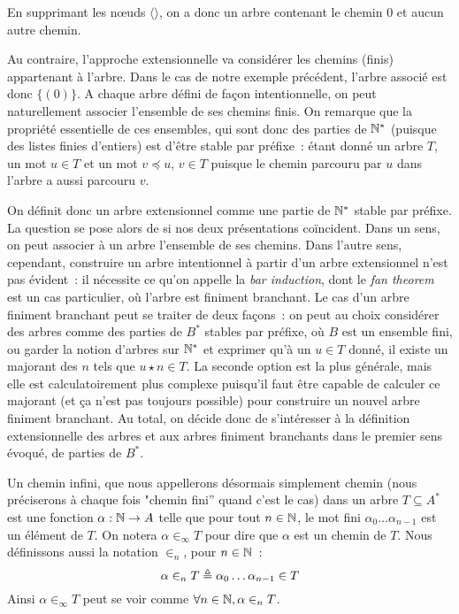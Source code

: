 \documentclass{article}
\begin{document}
En supprimant les n\oe uds $\langle\rangle$, on a donc un arbre contenant le chemin $0$ et aucun autre chemin.

Au contraire, l'approche extensionnelle va considérer les chemins (finis) appartenant à l'arbre. Dans le cas de notre exemple précédent, l'arbre associé est donc $\{(0)\}$. A chaque arbre défini de façon intentionnelle, on peut naturellement associer l'ensemble de ses chemins finis. On remarque que la propriété essentielle de ces ensembles, qui sont donc des parties de $\mathbb{N}^*$ (puisque des listes finies d'entiers) est d'être stable par préfixe~: étant donné un arbre $T$, un mot $u \in T$ et un mot $v\preceq u$, $v\in T$ puisque le chemin parcouru par $u$ dans l'arbre a aussi parcouru $v$.

On définit donc un arbre extensionnel comme une partie de $\mathbb{N}^*$ stable par préfixe. La question se pose alors de si nos deux présentations coïncident. Dans un sens, on peut associer à un arbre l'ensemble de ses chemins. Dans l'autre sens, cependant, construire un arbre intentionnel à partir d'un arbre extensionnel n'est pas évident~: il nécessite ce qu'on appelle la \textit{bar induction}, dont le \textit{fan theorem} est un cas particulier, où l'arbre est finiment branchant. Le cas d'un arbre finiment branchant peut se traiter de deux façons~: on peut au choix considérer des arbres comme des parties de $B^*$ stables par préfixe, où $B$ est un ensemble fini, ou garder la notion d'arbres sur $\mathbb{N}^*$ et exprimer qu'à un $u \in T$ donné, il existe un majorant des $n$ tels que $u \star n \in T$. La seconde option est la plus générale, mais elle est calculatoirement plus complexe puisqu'il faut être capable de calculer ce majorant (et ça n'est pas toujours possible) pour construire un nouvel arbre finiment branchant. Au total, on décide donc de s'intéresser à la définition extensionnelle des arbres et aux arbres finiment branchants dans le premier sens évoqué, de parties de $B^*$.

Un chemin infini, que nous appellerons désormais simplement chemin (nous préciserons à chaque fois "chemin fini'' quand c'est le cas) dans un arbre $T \subseteq A^*$ est une fonction $\alpha : \mathbb{N} \to A$ telle que pour tout $n\in \mathbb{N}$, le mot fini $\alpha_0\ldots\alpha_{n-1}$ est un élément de $T$. On notera $\alpha \in_\infty T$ pour dire que $\alpha$ est un chemin de $T$. Nous définissons aussi la notation $\in_n$, pour $n \in \mathbb{N}$~:
\[\alpha \in_n T \triangleq \alpha_0\ldots\alpha_{n-1} \in T\]
Ainsi $\alpha\in_\infty T$ peut se voir comme $\forall n\in \mathbb{N}, \alpha\in_n T$.
\end{document}
